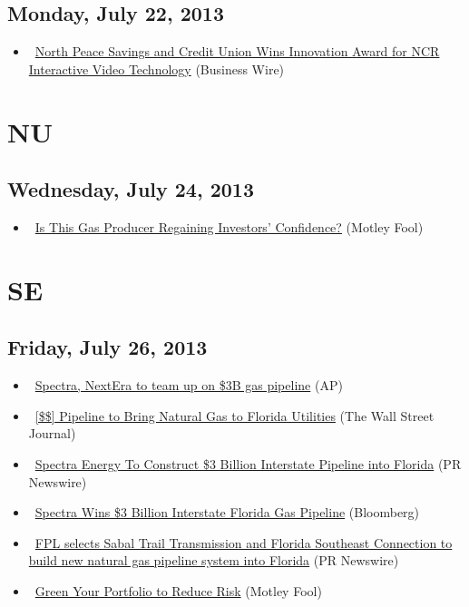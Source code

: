 \documentclass[11pt,asymmetric]{article}
\begin{document}
\subsection*{Monday, July 22, 2013}
\begin{itemize}
\item\ \href{http://finance.yahoo.com/news/north-peace-savings-credit-union-120000738.html}{North Peace Savings and Credit Union Wins Innovation Award for NCR Interactive Video Technology} (Business Wire)
\end{itemize}

\section*{NU}

\subsection*{Wednesday, July 24, 2013}
\begin{itemize}
\item\ \href{http://beta.fool.com/liorc/2013/07/24/is-this-gas-producer-regaining-investors-confidenc/41249/?source=eogyholnk0000001}{Is This Gas Producer Regaining Investors’ Confidence?} (Motley Fool)
\end{itemize}

\section*{SE}

\subsection*{Friday, July 26, 2013}
\begin{itemize}
\item\ \href{http://finance.yahoo.com/news/spectra-nextera-team-3b-gas-211358713.html}{Spectra, NextEra to team up on \$3B gas pipeline} (AP)
\item\ \href{http://online.wsj.com/article/SB10001424127887324564704578630231367566740.html?ru=yahoo&mod=yahoo_hs}{[\$\$] Pipeline to Bring Natural Gas to Florida Utilities} (The Wall Street Journal)
\item\ \href{http://finance.yahoo.com/news/spectra-energy-construct-3-billion-203500749.html}{Spectra Energy To Construct \$3 Billion Interstate Pipeline into Florida} (PR Newswire)
\item\ \href{http://www.bloomberg.com/news/2013-07-26/spectra-wins-3-billion-interstate-florida-gas-pipeline.html?cmpid=yhoo}{Spectra Wins \$3 Billion Interstate Florida Gas Pipeline} (Bloomberg)
\item\ \href{http://finance.yahoo.com/news/fpl-selects-sabal-trail-transmission-203000994.html}{FPL selects Sabal Trail Transmission and Florida Southeast Connection to build new natural gas pipeline system into Florida} (PR Newswire)
\item\ \href{http://www.fool.com/investing/general/2013/07/26/green-your-portfolio-to-reduce-risk.aspx?source=eogyholnk0000001}{Green Your Portfolio to Reduce Risk} (Motley Fool)
\end{itemize}
\end{document}

